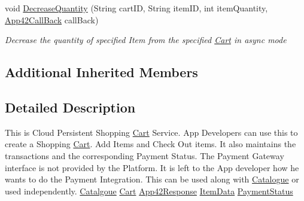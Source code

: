 \begin{DoxyCompactItemize}
void \hyperlink{classcom_1_1shephertz_1_1app42_1_1paas_1_1sdk_1_1csharp_1_1shopping_1_1_cart_service_ad586e063d6c243af031df7062d1c4a00}{Decrease\+Quantity} (String cart\+I\+D, String item\+I\+D, int item\+Quantity, \hyperlink{interfacecom_1_1shephertz_1_1app42_1_1paas_1_1sdk_1_1csharp_1_1_app42_call_back}{App42\+Call\+Back} call\+Back)
\begin{DoxyCompactList}\small\item\em Decrease the quantity of specified Item from the specified \hyperlink{classcom_1_1shephertz_1_1app42_1_1paas_1_1sdk_1_1csharp_1_1shopping_1_1_cart}{Cart} in async mode \end{DoxyCompactList}\end{DoxyCompactItemize}
\subsection*{Additional Inherited Members}


\subsection{Detailed Description}
This is Cloud Persistent Shopping \hyperlink{classcom_1_1shephertz_1_1app42_1_1paas_1_1sdk_1_1csharp_1_1shopping_1_1_cart}{Cart} Service. App Developers can use this to create a Shopping \hyperlink{classcom_1_1shephertz_1_1app42_1_1paas_1_1sdk_1_1csharp_1_1shopping_1_1_cart}{Cart}. Add Items and Check Out items. It also maintains the transactions and the corresponding Payment Status. The Payment Gateway interface is not provided by the Platform. It is left to the App developer how he wants to do the Payment Integration. This can be used along with \hyperlink{classcom_1_1shephertz_1_1app42_1_1paas_1_1sdk_1_1csharp_1_1shopping_1_1_catalogue}{Catalogue} or used independently. \hyperlink{classcom_1_1shephertz_1_1app42_1_1paas_1_1sdk_1_1csharp_1_1shopping_1_1_cart_service}{Catalgoue} \hyperlink{classcom_1_1shephertz_1_1app42_1_1paas_1_1sdk_1_1csharp_1_1shopping_1_1_cart_service}{Cart} \hyperlink{classcom_1_1shephertz_1_1app42_1_1paas_1_1sdk_1_1csharp_1_1shopping_1_1_cart_service}{App42\+Response} \hyperlink{classcom_1_1shephertz_1_1app42_1_1paas_1_1sdk_1_1csharp_1_1shopping_1_1_cart_service}{Item\+Data} \hyperlink{classcom_1_1shephertz_1_1app42_1_1paas_1_1sdk_1_1csharp_1_1shopping_1_1_cart_service}{Payment\+Status} 



